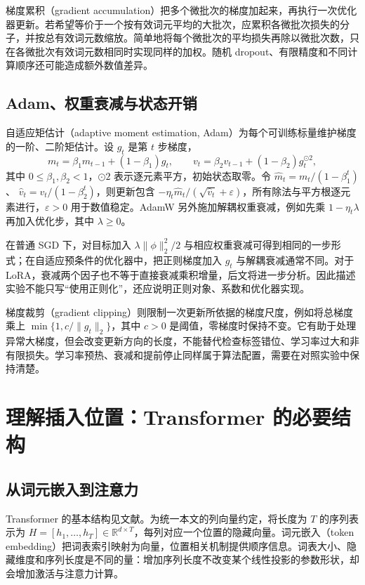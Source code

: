 \documentclass[UTF8,12pt,a4paper,fontset=fandol]{ctexart}
\begin{document}
梯度累积（gradient accumulation）把多个微批次的梯度加起来，再执行一次优化器更新。若希望等价于一个按有效词元平均的大批次，应累积各微批次损失的分子，并按总有效词元数缩放。简单地将每个微批次的平均损失再除以微批次数，只在各微批次有效词元数相同时实现同样的加权。随机 dropout、有限精度和不同计算顺序还可能造成额外数值差异。

\subsection{Adam、权重衰减与状态开销}

自适应矩估计（adaptive moment estimation, Adam）为每个可训练标量维护梯度的一阶、二阶矩估计。设 $g_t$ 是第 $t$ 步梯度，
\[
m_t=\beta_1m_{t-1}+(1-\beta_1)g_t,\qquad
v_t=\beta_2v_{t-1}+(1-\beta_2)g_t^{\odot2},
\]
其中 $0\leq\beta_1,\beta_2<1$，$\odot2$ 表示逐元素平方，初始状态取零。令
$\widehat m_t=m_t/(1-\beta_1^t)$、
$\widehat v_t=v_t/(1-\beta_2^t)$，则更新包含
$-\eta_t\widehat m_t/(\sqrt{\widehat v_t}+\varepsilon)$，所有除法与平方根逐元素进行，$\varepsilon>0$ 用于数值稳定。AdamW 另外施加解耦权重衰减，例如先乘 $1-\eta_t\lambda$ 再加入优化步，其中 $\lambda\geq0$。

在普通 SGD 下，对目标加入 $\lambda\|\phi\|_2^2/2$ 与相应权重衰减可得到相同的一步形式；在自适应预条件的优化器中，把正则梯度加入 $g_t$ 与解耦衰减通常不同。对于 LoRA，衰减两个因子也不等于直接衰减乘积增量，后文将进一步分析。因此描述实验不能只写“使用正则化”，还应说明正则对象、系数和优化器实现。

梯度裁剪（gradient clipping）则限制一次更新所依据的梯度尺度，例如将总梯度乘上
$\min\{1,c/\|g_t\|_2\}$，其中 $c>0$ 是阈值，零梯度时保持不变。它有助于处理异常大梯度，但会改变更新方向的长度，不能替代检查标签错位、学习率过大和非有限损失。学习率预热、衰减和提前停止同样属于算法配置，需要在对照实验中保持清楚。

\section{理解插入位置：Transformer 的必要结构}
\label{sec:transformer}

\subsection{从词元嵌入到注意力}

Transformer 的基本结构见文献\cite{vaswani2017}。为统一本文的列向量约定，将长度为 $T$ 的序列表示为
$H=[h_1,\ldots,h_T]\in\mathbb R^{d\times T}$，每列对应一个位置的隐藏向量。词元嵌入（token embedding）把词表索引映射为向量，位置相关机制提供顺序信息。词表大小、隐藏维度和序列长度是不同的量：增加序列长度不改变某个线性投影的参数形状，却会增加激活与注意力计算。
\end{document}
